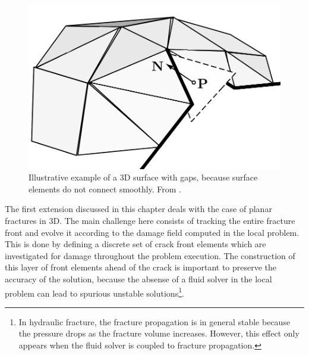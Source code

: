 \begin{figure}[h]
    \centering
    \includegraphics[width=0.6\linewidth]{Chapter4/figures/surface_with_gap.png}
    \caption{Illustrative example of a 3D surface with gaps, because surface elements do not connect smoothly. From \cite{gasser20063d}.}
    \label{fig:gaps}
\end{figure}

The first extension discussed in this chapter deals with the case of planar fractures in 3D. The main challenge here consists of tracking the entire fracture front and evolve it according to the damage field computed in the local problem. This is done by defining a discrete set of crack front elements which are investigated for damage throughout the problem execution. The construction of this layer of front elements ahead of the crack is important to preserve the accuracy of the solution, because the absense of a fluid solver in the local problem can lead to spurious unstable solutions\footnote{In hydraulic fracture, the fracture propagation is in general stable because the pressure drops as the fracture volume increases. However, this effect only appears when the fluid solver is coupled to fracture propagation.}.  